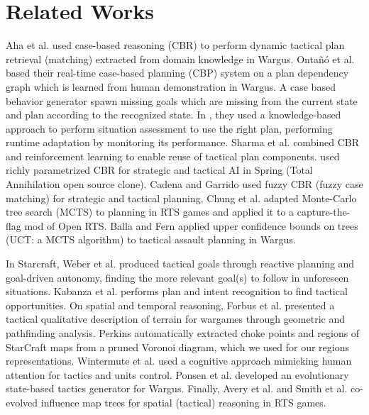 \section{Related Works}

Aha et al. \cite{LTW} used case-based reasoning (CBR) to perform dynamic tactical plan retrieval (matching) extracted from domain knowledge in Wargus. Onta\~{n}\'{o} et al. \cite{Ontanon07} based their real-time case-based planning (CBP) system on a plan dependency graph which is learned from human demonstration in Wargus. A case based behavior generator spawn missing goals which are missing from the current state and plan according to the recognized state. In \cite{PlanRetrieval,meta-rts}, they used a knowledge-based approach to perform situation assessment to use the right plan, performing runtime adaptation by monitoring its performance. Sharma et al. \cite{CBR-RL} combined CBR and reinforcement learning to enable reuse of tactical plan components. 
\cite{Bakkes09} used richly parametrized CBR for strategic and tactical AI in Spring (Total Annihilation open source clone). 
Cadena and Garrido \cite{CadenaG11} used fuzzy CBR (fuzzy case matching) for strategic and tactical planning. Chung et al. \cite{Chung05} adapted Monte-Carlo tree search (MCTS) to planning in RTS games and applied it to a capture-the-flag mod of Open RTS. Balla and Fern \cite{Balla_uctfor} applied upper confidence bounds on trees (UCT: a MCTS algorithm) to tactical assault planning in Wargus. 

In Starcraft, Weber et al. \cite{Weber2010cr,WeberCIG10} produced tactical goals through reactive planning and goal-driven autonomy, finding the more relevant goal(s) to follow in unforeseen situations. Kabanza et al. \cite{OBRecog} performs plan and intent recognition to find tactical opportunities. %
On spatial and temporal reasoning, Forbus et al. \cite{Forbus2002} presented a tactical qualitative description of terrain for wargames through geometric and pathfinding analysis. Perkins \cite{Perkins2010} automatically extracted choke points and regions of StarCraft maps from a pruned Voronoi diagram, which we used for our regions representations. Wintermute et al. \cite{SORTS} used a cognitive approach mimicking human attention for tactics and units control. Ponsen et al. \cite{PonsenMSA06} developed an evolutionary state-based tactics generator for Wargus. %
Finally, Avery et al. \cite{Avery09} and Smith et al. \cite{SmithCIG10} co-evolved influence map trees for spatial (tactical) reasoning in RTS games. 

